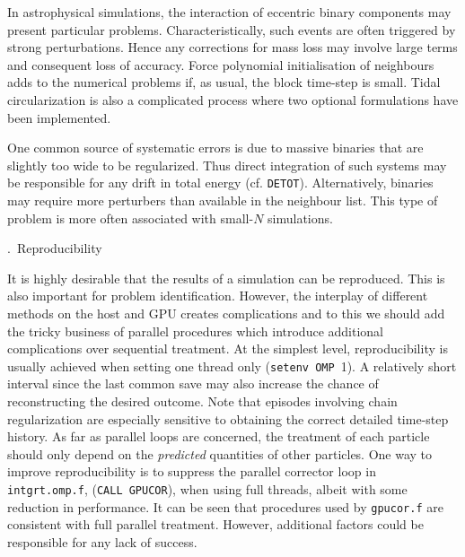 \documentclass[12pt]{article}
\begin{document}
In astrophysical simulations, the interaction of eccentric binary components may present
particular problems.
Characteristically, such events are often triggered by strong perturbations.
Hence any corrections for mass loss may involve large terms and consequent loss of accuracy.
Force polynomial initialisation of neighbours adds to the numerical problems if, as usual,
the block time-step is small.
Tidal circularization is also a complicated process where two optional formulations
have been implemented.

One common source of systematic errors is due to massive binaries that are slightly too 
wide to be regularized.
Thus direct integration of such systems may be responsible for any drift in total energy
(cf. {\tt DETOT}).
Alternatively, binaries may require more perturbers than available in the neighbour list.
This type of problem is more often associated with small-$N$ simulations.


\bigskip
{}.~Reproducibility

\medskip
It is highly desirable that the results of a simulation can be reproduced.
This is also important for problem identification.
However, the interplay of different methods on the host and GPU creates
complications and to this we should add the tricky business of parallel
procedures which introduce additional complications over sequential treatment.
At the simplest level, reproducibility is usually achieved when setting
one thread only ({\tt setenv~OMP}~1).
A relatively short interval since the last common save may also increase the
chance of reconstructing the desired outcome.
Note that episodes involving chain regularization are especially sensitive to obtaining
the correct detailed time-step history.
As far as parallel loops are concerned, the treatment of each particle should only
depend on the {\it predicted} quantities of other particles.
One way to improve reproducibility is to suppress the parallel corrector loop in
{\tt intgrt.omp.f}, ({\tt CALL GPUCOR}), when using full threads, albeit with some
reduction in performance.
It can be seen that procedures used by {\tt gpucor.f} are consistent with full
parallel treatment.
However, additional factors could be responsible for any lack of success.
\end{document}
